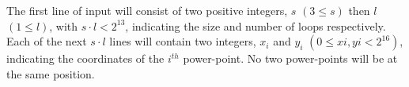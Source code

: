 The first line of input will consist of two positive integers,
$s$ $(3 \le s)$ then $l$ $(1 \le l)$, with $s \cdot l < 2^{13}$,
indicating the size and number of loops respectively. Each of the
next $s \cdot l$ lines will contain two integers, $x_i$ and $y_i$
$(0 \le xi, yi < 2^{16})$, indicating the coordinates of the
$i^{th}$ power-point. No two power-points will be at the same position.
